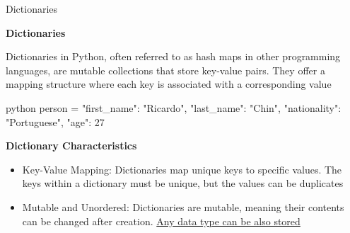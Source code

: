 \documentclass[
	11pt, 
]{beamer}
\begin{document}
\begin{frame}[fragile]{Dictionaries}
    \scriptsize
\begin{block}{\textbf{Dictionaries}}
    
Dictionaries in Python, often referred to as hash maps in other programming languages, are mutable collections that store key-value pairs. They offer a mapping structure where each key is associated with a corresponding value

\end{block}

\begin{mintedbox}{python}
person = {  "first_name": "Ricardo",
            "last_name": "Chin",
            "nationality": "Portuguese",
            "age": 27            }
\end{mintedbox}

\begin{exampleblock}{\textbf{Dictionary Characteristics}}
    \begin{itemize}
        \item Key-Value Mapping: Dictionaries map unique keys to specific values. The keys within a dictionary must be unique, but the values can be duplicates
        \item Mutable and Unordered: Dictionaries are mutable, meaning their contents can be changed after creation. \underline{Any data type can be also stored}
    \end{itemize}    
\end{exampleblock}
    
\end{frame}


\end{document}
